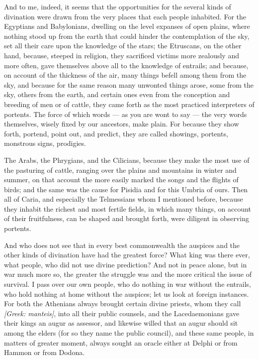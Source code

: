  And to me, indeed, it seems that the opportunities for the several kinds of divination were drawn from the very places that each people inhabited. For the Egyptians and Babylonians, dwelling on the level expanses of open plains, where nothing stood up from the earth that could hinder the contemplation of the sky, set all their care upon the knowledge of the stars; the Etruscans, on the other hand, because, steeped in religion, they sacrificed victims more zealously and more often, gave themselves above all to the knowledge of entrails; and because, on account of the thickness of the air, many things befell among them from the sky, and because for the same reason many unwonted things arose, some from the sky, others from the earth, and certain ones even from the conception and breeding of men or of cattle, they came forth as the most practiced interpreters of portents. The force of which words — as you are wont to say — the very words themselves, wisely fixed by our ancestors, make plain. For because they show forth, portend, point out, and predict, they are called showings, portents, monstrous signs, prodigies.

 The Arabs, the Phrygians, and the Cilicians, because they make the most use of the pasturing of cattle, ranging over the plains and mountains in winter and summer, on that account the more easily marked the songs and the flights of birds; and the same was the cause for Pisidia and for this Umbria of ours. Then all of Caria, and especially the Telmessians whom I mentioned before, because they inhabit the richest and most fertile fields, in which many things, on account of their fruitfulness, can be shaped and brought forth, were diligent in observing portents.

 And who does not see that in every best commonwealth the auspices and the other kinds of divination have had the greatest force? What king was there ever, what people, who did not use divine prediction? And not in peace alone, but in war much more so, the greater the struggle was and the more critical the issue of survival. I pass over our own people, who do nothing in war without the entrails, who hold nothing at home without the auspices; let us look at foreign instances. For both the Athenians always brought certain divine priests, whom they call \textit{[Greek: manteis]}, into all their public counsels, and the Lacedaemonians gave their kings an augur as assessor, and likewise willed that an augur should sit among the elders (for so they name the public council), and these same people, in matters of greater moment, always sought an oracle either at Delphi or from Hammon or from Dodona.

